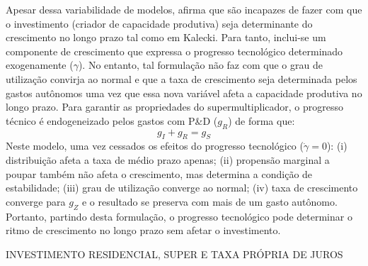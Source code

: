 Apesar dessa variabilidade de modelos, \textcite{dutt_observations_2018} afirma que são incapazes de fazer com que o investimento (criador de capacidade produtiva) seja determinante do crescimento no longo prazo tal como em Kalecki. Para tanto, inclui-se um componente de crescimento que expressa o progresso tecnológico determinado exogenamente ($\gamma$). No entanto, tal formulação não faz com que o grau de utilização convirja ao normal e que a taxa de crescimento seja determinada pelos gastos autônomos uma vez que essa nova variável afeta a capacidade produtiva no longo prazo. Para garantir as propriedades do supermultiplicador, o progresso técnico é endogeneizado pelos gastos com P\&D ($g_R$) de forma que:
$$
g_I + g_R = g_S
$$
Neste modelo, uma vez cessados os efeitos do progresso tecnológico ($\dot \gamma = 0$): 
	(i) distribuição afeta a taxa de médio prazo apenas; 
	(ii) propensão marginal a poupar também não afeta o crescimento, mas determina a condição de estabilidade; 
	(iii) grau de utilização converge ao normal; 
	(iv) taxa de crescimento converge para $g_Z$ e o resultado se preserva com mais de um gasto autônomo. Portanto, partindo desta formulação, o progresso tecnológico pode determinar o ritmo de crescimento no longo prazo sem afetar o investimento.


INVESTIMENTO RESIDENCIAL, SUPER E TAXA PRÓPRIA DE JUROS

